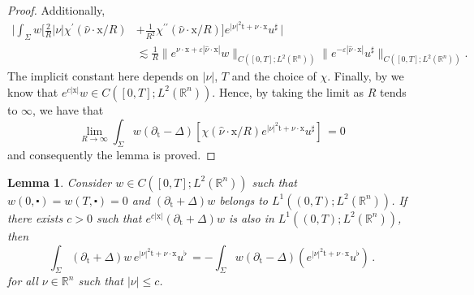 \documentclass[10pt,a4paper]{amsart}
\newtheorem{lemma}[proposition]{Lemma}
\newcommand{\R}{\mathbb{R}}
\newcommand{\tm}{\mathrm{t}}
\newcommand{\x}{\mathrm{x}}
\begin{document}
\begin{proof}
Additionally,
\begin{align*}
\Big| \int_{\Sigma} w \Big[\frac{2}{R} |\nu| \chi^\prime (\hat \nu \cdot \x/R)& + \frac{1}{R^2} \chi^{\prime \prime} (\hat \nu \cdot \x/R) \Big] e^{|\nu|^2 \tm + \nu \cdot \x} u^\sharp \, \Big|\\
& \lesssim \frac{1}{R} \| e^{\nu \cdot \x + \varepsilon |\hat \nu \cdot \x|} w \|_{C([0, T] ; L^{2}(\mathbb{R}^{n}))}  \| e^{-\varepsilon |\hat \nu \cdot \x|} u^\sharp \|_{C([0, T] ; L^{2}(\mathbb{R}^{n}))}.
\end{align*}
The implicit constant here depends on $|\nu|$, $T$ and the choice of $\chi$. Finally,
by  we know that $e^{c|\x|} w \in C([0, T] ; L^{2}(\mathbb{R}^{n}))$.
Hence, by taking the limit as $R$ tends to $\infty$, we have that
\[ \lim_{R\to \infty} \int_{\Sigma} w (\partial_{\tm}-\Delta) [\chi(\hat \nu \cdot \x/R) e^{|\nu|^2 \tm + \nu \cdot \x} u^\sharp] \, = 0 \]
and consequently the lemma is proved.

\end{proof}

\begin{lemma}\label{lem:uflat}\sl
Consider $w \in C([0, T] ; L^{2}(\mathbb{R}^{n}))$ such that 
$w (0, \centerdot) = w(T, \centerdot)=0$ 
and $(\partial_{\tm}+\Delta)w $ belongs to $ L^{1}((0, T) ; L^{2}(\mathbb{R}^{n}))$.
If there exists $c > 0$ such that 
$e^{c|\x|} (\partial_{\tm}+\Delta)w $ is also in $ L^{1}((0, T) ; L^{2}(\mathbb{R}^{n}))$, then
\[\int_{\Sigma}(\partial_{\tm}+\Delta) w \, e^{|\nu|^2 \tm + \nu \cdot \x} u^\flat \, = - \int_{\Sigma} w ( \partial_{\tm}-\Delta) (e^{|\nu|^2 \tm + \nu \cdot \x} u^\flat) \, .\]
for all $\nu \in \R^n$ such that $|\nu| \leq c$.
\end{lemma}
\end{document}
